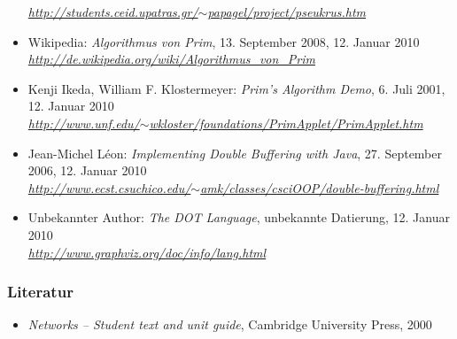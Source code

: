 \documentclass[a4paper,titlepage]{article}
\begin{document}
\begin{itemize}
	\emph{\href{http://students.ceid.upatras.gr/~papagel/project/pseukrus.htm}{http://students.ceid.upatras.gr/$\sim$papagel/project/pseukrus.htm}}
\item Wikipedia: \emph{Algorithmus von Prim}, 13. September 2008, 12. Januar 2010 \\
	\emph{\href{http://de.wikipedia.org/wiki/Algorithmus_von_Prim}{http://de.wikipedia.org/wiki/Algorithmus\_von\_Prim}}
\item Kenji Ikeda, William F. Klostermeyer: \emph{Prim's Algorithm Demo}, 6. Juli 2001, 12. Januar 2010 \\
	\emph{\href{http://www.unf.edu/~wkloster/foundations/PrimApplet/PrimApplet.htm}{http://www.unf.edu/$\sim$wkloster/foundations/PrimApplet/PrimApplet.htm}}
\item Jean-Michel Léon: \emph{Implementing Double Buffering with Java}, 27. September 2006, 12. Januar 2010 \\
	\emph{\href{http://www.ecst.csuchico.edu/~amk/classes/csciOOP/double-buffering.html}{http://www.ecst.csuchico.edu/$\sim$amk/classes/csciOOP/double-buffering.html}}
\item Unbekannter Author: \emph{The DOT Language}, unbekannte Datierung, 12. Januar 2010 \\
	\emph{\href{http://www.graphviz.org/doc/info/lang.html}{http://www.graphviz.org/doc/info/lang.html}}
\end{itemize}

\subsubsection{Literatur}
\begin{itemize}
\item \emph{Networks -- Student text and unit guide}, Cambridge University Press, 2000
\end{itemize}
\end{document}
